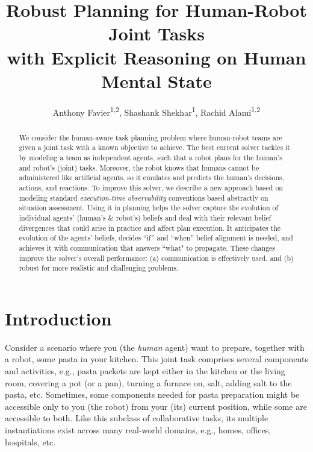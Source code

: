 \documentclass[letterpaper]{article} %
\title
{
Robust Planning for Human-Robot Joint Tasks \\ with Explicit Reasoning on Human Mental State
}
\author{
    Anthony Favier\textsuperscript{\rm 1,2},
    Shashank Shekhar\textsuperscript{\rm 1},
    Rachid Alami\textsuperscript{\rm 1,2}
}
\begin{document}


\maketitle

\begin{abstract}
We consider the human-aware task planning problem where human-robot teams are given a joint task with a known objective to achieve. 
The best current solver tackles it by modeling a team as independent agents, such that a robot plans for the human's and robot's (joint) tasks. 
Moreover, the robot knows that humans cannot be administered like artificial agents, so it emulates and predicts the human's decisions, actions, and reactions. 
To improve this solver, we describe a new approach based on modeling standard {\em execution-time observability} conventions based abstractly on situation assessment. Using it in planning helps the solver capture the evolution of individual agents' (human's \& robot's) beliefs and deal with their relevant belief divergences that could arise in practice and affect plan execution. 
It anticipates the evolution of the agents' beliefs, decides ``if'' and ``when'' belief alignment is needed, and achieves it with communication that answers ``what" to propagate.
These changes improve the solver's overall performance: (a) communication is effectively used, and (b) robust for more realistic and challenging problems.
\end{abstract}

\section{Introduction}

Consider a scenario where you (the \textit{human} agent) want to prepare, together with a robot, some pasta in your kitchen. This joint task comprises several components and activities, e.g., pasta packets are kept either in the kitchen or the living room, covering a pot (or a pan), turning a furnace on, salt, adding salt to the pasta, etc. 
Sometimes, some components needed for pasta preparation might be accessible only to you (the robot) from your (its) current position, while some are accessible to both. 
Like this subclass of collaborative tasks, its multiple instantiations exist across many real-world domains, e.g., homes, offices, hospitals, etc.
\end{document}
